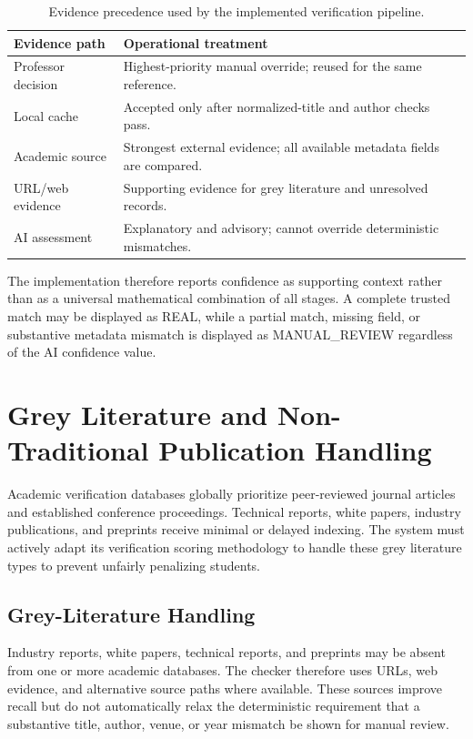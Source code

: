 \documentclass[12pt,a4paper,oneside]{report}
\begin{document}
\begin{table}[H]
\centering
\begin{tabular}{
    >{\raggedright\arraybackslash}p{}
    >{\raggedright\arraybackslash}p{}
}
\toprule
\textbf{Evidence path} & \textbf{Operational treatment} \\
\midrule
Professor decision & Highest-priority manual override; reused for the same reference. \\
Local cache & Accepted only after normalized-title and author checks pass. \\
Academic source & Strongest external evidence; all available metadata fields are compared. \\
URL/web evidence & Supporting evidence for grey literature and unresolved records. \\
AI assessment & Explanatory and advisory; cannot override deterministic mismatches. \\
\bottomrule
\end{tabular}
\caption{Evidence precedence used by the implemented verification pipeline.}
\label{tab:evidence_precedence}
\end{table}

The implementation therefore reports confidence as supporting context rather than as a universal mathematical combination of all stages. A complete trusted match may be displayed as REAL, while a partial match, missing field, or substantive metadata mismatch is displayed as MANUAL\_REVIEW regardless of the AI confidence value.



\section{Grey Literature and Non-Traditional Publication Handling}

Academic verification databases globally prioritize peer-reviewed journal articles and established conference proceedings. Technical reports, white papers, industry publications, and preprints receive minimal or delayed indexing. The system must actively adapt its verification scoring methodology to handle these grey literature types to prevent unfairly penalizing students.

\subsection{Grey-Literature Handling}
Industry reports, white papers, technical reports, and preprints may be absent from one or more academic databases. The checker therefore uses URLs, web evidence, and alternative source paths where available. These sources improve recall but do not automatically relax the deterministic requirement that a substantive title, author, venue, or year mismatch be shown for manual review.
\end{document}
